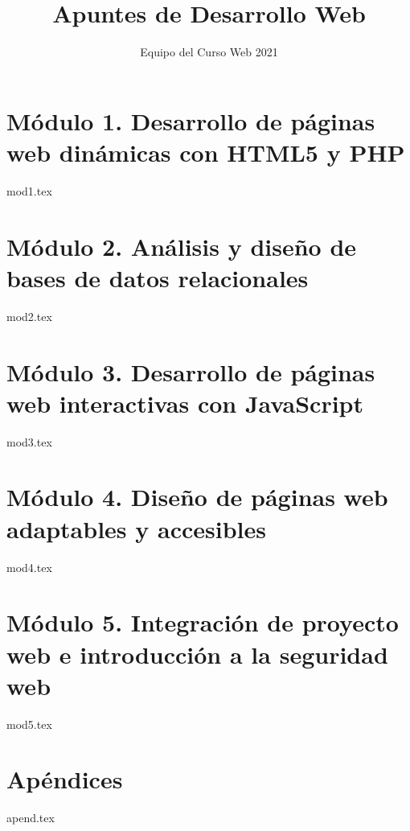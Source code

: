 \documentclass[12pt]{report}
\title{Apuntes de Desarrollo Web}
\author{Equipo del Curso Web 2021}
\begin{document}
	\maketitle
	\tableofcontents
	\chapter{Módulo 1. Desarrollo de páginas web dinámicas con HTML5 y PHP}
		{mod1.tex}
	\chapter{Módulo 2. Análisis y diseño de bases de datos relacionales}
		{mod2.tex}
	\chapter{Módulo 3. Desarrollo de páginas web interactivas con JavaScript}
		{mod3.tex}
	\chapter{Módulo 4. Diseño de páginas web adaptables y accesibles}
		{mod4.tex}
	\chapter{Módulo 5. Integración de proyecto web e introducción a la seguridad web}
		{mod5.tex}
	\appendix
	\chapter{Apéndices}
		{apend.tex}
\end{document}
